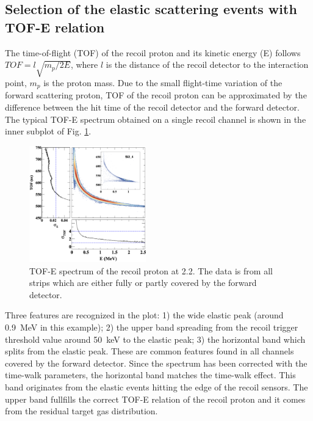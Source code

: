 \documentclass[number,5p]{elsarticle}
\begin{document}
\subsection{Selection of the elastic scattering events with TOF-E relation}
\label{sec:tofe_selection}
The time-of-flight (TOF) of the recoil proton and its kinetic energy (E)
follows $TOF = l\sqrt{m_p/2E}$, where $l$ is the distance of
the recoil detector to the interaction point, $m_p$ is the proton mass.
Due to the small flight-time variation of the forward scattering proton, TOF of
the recoil proton can be approximated by the difference between the hit time of the recoil detector and the forward detector.
The typical TOF-E spectrum obtained on a single recoil channel is shown in the inner subplot of Fig. \ref{fig:tof-e}. 
\begin{figure}[h!]
  \centering
  \includegraphics[width=0.45\textwidth]{./tofe_sigma.png}
  \caption{
    TOF-E spectrum of the recoil proton at \SI{2.2}{\momentum}. The data is from all
    strips which are either fully or partly covered by the forward detector.}
  \label{fig:tof-e}
\end{figure}
Three features are recognized in the plot: 1) the wide elastic peak (around
\SI{0.9}{\MeV} in this example);
2) the upper band spreading from the recoil trigger threshold value around
\SI{50}{\keV} to the elastic peak; 3) the horizontal band which splits from the
elastic peak. 
These are common features found in all channels covered by the forward detector.
Since the spectrum has been corrected with the time-walk parameters, the horizontal band matches the time-walk effect.
This band originates from the elastic events hitting the edge of the recoil sensors.
The upper band fullfills the correct TOF-E relation of the recoil proton and it comes
from the residual target gas distribution.
\end{document}
